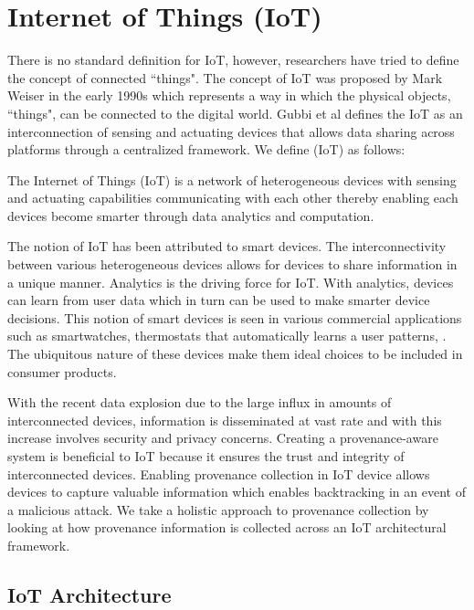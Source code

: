  
\section{Internet of Things (IoT)}
There is no standard definition for IoT, however, researchers have tried to define the concept of connected ``things". The concept of IoT was proposed by Mark Weiser in the early 1990s\cite{Mattern} which represents a way in which the physical objects, ``things", can be connected to the digital world. Gubbi et al \cite{park_provenance-based_2012} defines the IoT as  an interconnection of sensing and actuating devices that allows data sharing across platforms through a centralized framework. We define (IoT) as follows:

\begin{definition}
The Internet of Things (IoT) is a network of heterogeneous devices with sensing and actuating capabilities communicating with each other thereby enabling each devices become smarter through data analytics and computation. 

\end{definition}

The notion of IoT has been attributed to smart devices. The interconnectivity between various heterogeneous devices allows for devices to share information in a unique manner. Analytics is the driving force for IoT. With analytics, devices can learn from user data which in turn can be used to make smarter device decisions. This notion of smart devices is seen in various commercial applications such as smartwatches, thermostats that automatically learns a user patterns, . The ubiquitous nature of these devices make them ideal choices to be included in consumer products. 

\par With the recent data explosion \cite{emc_bigdata} due to the large influx in amounts of interconnected devices, information is disseminated at vast rate and with this increase involves security and privacy concerns. Creating a provenance-aware system is beneficial to IoT because it ensures the trust and  integrity of interconnected devices. Enabling provenance collection in IoT device allows devices to capture valuable information which enables backtracking in an event of a malicious attack. We take a holistic approach to provenance collection by looking at how provenance information is collected across an IoT architectural framework.

 
  \subsection{IoT Architecture}

